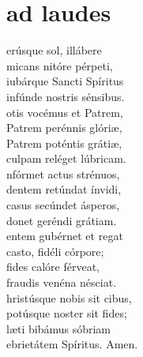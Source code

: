 \thispagestyle{plain}
\section{ad laudes}




\vspace{0.15cm}



\def\greinitialformat#1{{\fontsize{40}{40}\selectfont #1}}

\begin{multicols}{2}
 
\noindent{}erúsque sol, illábere\\
micans nitóre pérpeti, \\
iubárque Sancti Spíritus\\
infúnde nostris sénsibus.\\

\noindent{}otis vocémus et Patrem, \\
Patrem perénnis glóriæ, \\
Patrem poténtis grátiæ, \\
culpam reléget lúbricam.\\

\noindent{}nfórmet actus strénuos, \\
dentem retúndat ínvidi,\\
casus secúndet ásperos, \\
donet geréndi grátiam.\\

\noindent{}entem gubérnet et regat\\
casto, fidéli córpore;\\
fides calóre férveat, \\
fraudis venéna nésciat.\\

\noindent{}hristúsque nobis sit cibus, \\
potúsque noster sit fides;\\
læti bibámus sóbriam\\
ebrietátem Spíritus. Amen.\\





\end{multicols}


